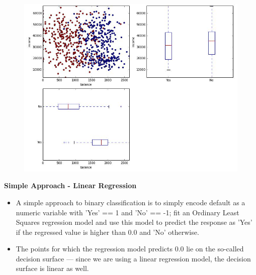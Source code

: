 \documentclass[MASTER.tex]{subfiles}
\begin{document}
\begin{frame}
\begin{figure}
\centering
\includegraphics[width=0.9\linewidth]{sklcass/sklclass4}

\end{figure}
\end{frame}
\begin{frame}
	
	\Large
\textbf{Simple Approach - Linear Regression}
\begin{itemize}
\item A simple approach to binary classification is to simply encode default as a numeric variable with 'Yes' == 1 and 'No' == -1; fit an Ordinary Least Squares regression model and use this model to predict the response as 'Yes' if the regressed value is higher than 0.0 and 'No' otherwise. 
\item The points for which the regression model predicts 0.0 lie on the so-called decision surface — since we are using a linear regression model, the decision surface is linear as well.
\end{itemize}

\end{frame}
\end{document}
